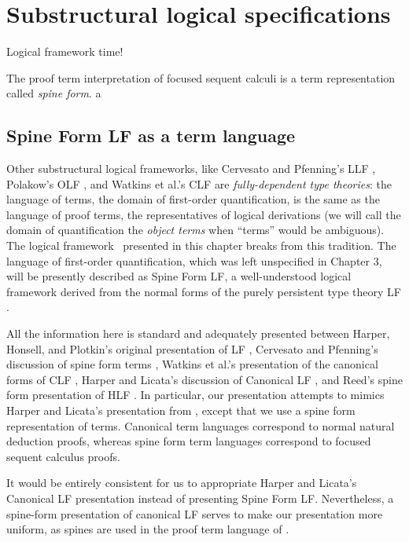\chapter{Substructural logical specifications}
\label{chapter-framework}

Logical framework time!

The proof term interpretation of focused sequent calculi is a term
representation called {\it spine form}. 
a

\section{Spine Form LF as a term language}

Other substructural logical frameworks, like Cervesato and Pfenning's
LLF \cite{cervesato02linear}, Polakow's OLF \cite{polakow01ordered},
and Watkins et al.'s CLF \cite{watkins02concurrent} are {\it
  fully-dependent type theories}: the language of terms, the domain of
first-order quantification, is the same as the language of proof
terms, the representatives of logical derivations (we will call the
domain of quantification the {\it object terms} when ``terms'' would
be ambiguous). The logical framework \sls~presented in this chapter
breaks from this tradition. The language of first-order
quantification, which was left unspecified in Chapter 3, will be
presently described as Spine Form LF, a well-understood logical
framework derived from the normal forms of the purely persistent type
theory LF \cite{harper93framework}.

All the information here is standard and adequately presented between
Harper, Honsell, and Plotkin's original presentation of LF
\cite{harper93framework}, Cervesato and Pfenning's discussion of spine
form terms \cite{cervesato02linear}, Watkins et al.'s presentation of
the canonical forms of CLF \cite{watkins02concurrent}, Harper and
Licata's discussion of Canonical LF \cite{harper07mechanizing}, and
Reed's spine form presentation of HLF \cite{reed09hybrid}. In
particular, our presentation attempts to mimics Harper and Licata's
presentation from \cite{harper07mechanizing}, except that we use a
spine form representation of terms. Canonical term languages
correspond to normal natural deduction proofs, whereas spine form term
languages correspond to focused sequent calculus proofs.

It would be entirely consistent for us to appropriate Harper and
Licata's Canonical LF presentation instead of presenting Spine Form
LF. Nevertheless, a spine-form presentation of canonical LF serves to
make our presentation more uniform, as spines are used in the proof
term language of \sls.


